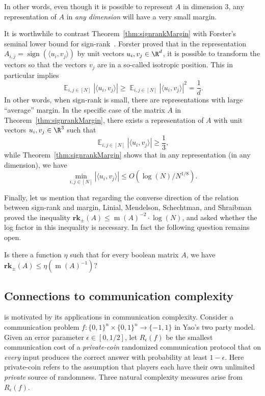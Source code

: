 \documentclass{toc}
\DeclareMathOperator{\Ex}{{\mathbb E}}
\DeclareMathOperator{\sign}{sign}
\DeclareMathOperator{\margin}{m}
\newcommand{\srk}{\mathbf{rk}_{\pm}}   %
\begin{document}
In other words, even though it is possible to represent $A$ in dimension $3$, any representation of $A$ in \emph{any dimension} will have a very small margin.

It is worthwhile to contrast Theorem~\ref{thm:signrankMargin} with  Forster's seminal lower bound for sign-rank~\cite{forster2002linear}. Forster proved that in the representation $A_{i,j}=\sign(\langle u_i,v_j \rangle)$ by unit vectors $u_i,v_j \in \R^d$, it is possible to transform the vectors  so that the vectors $v_j$ are in a so-called isotropic position. This in particular implies 
$$\Ex_{i,j \in [N]} |\langle u_i,v_j\rangle| \ge \Ex_{i,j \in [N]} |\langle u_i,v_j\rangle|^2 = \frac{1}{d}.$$
In other words, when sign-rank is small, there are representations with large ``average'' margin. In the specific case of the matrix $A$ in Theorem~\ref{thm:signrankMargin}, there exists a representation of $A$ with unit vectors $u_i,v_j \in \R^3$ such that 
$$\Ex_{i,j \in [N]} |\langle u_i,v_j\rangle| \ge \frac{1}{3},$$
while Theorem~\ref{thm:signrankMargin} shows that in any  representation (in any dimension), we have
$$\min_{i,j \in [N]} |\langle u_i,v_j\rangle| \le O(\log(N)/N^{1/8}).$$

Finally, let us mention that regarding the converse direction of the relation between sign-rank and margin, Linial, Mendelson, Schechtman, and Shraibman~\cite[Corollary 3.2, Lemma 4.2, and Section 8]{MR2359826}  proved the inequality $\srk(A) \le \margin(A)^{-2} \cdot \log(N)$, and asked whether the log factor in this inequality is necessary. In fact the following question remains open. 
\begin{question} 
Is there a function $\eta$ such that for every boolean matrix $A$, we have $\srk(A)\leq \eta(\margin(A)^{-1})$? 
\end{question}





\subsection{Connections to communication complexity}

 is  motivated by its applications in communication complexity.  Consider a communication problem $f:\{0,1\}^n \times \{0,1\}^n \to \{-1,1\}$ in Yao's two party model. Given an error parameter  $\epsilon \in [0,1/2]$, let $R_{\epsilon}(f)$  be the smallest communication cost of a \emph{private-coin} randomized communication protocol that  on \emph{every} input produces the correct answer  with   probability at least  $1-\epsilon$.  Here private-coin refers to the assumption that  players each have their own unlimited \emph{private} source of randomness.   Three natural complexity measures arise from $R_{\epsilon}(f)$.
\end{document}

